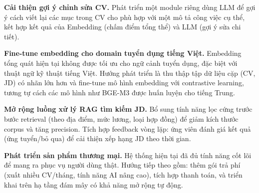 \documentclass[../DoAn.tex]{subfiles}
\begin{document}
\textbf{Cải thiện gợi ý chỉnh sửa CV.} Phát triển một module riêng dùng LLM để gợi ý cách viết lại các mục trong CV cho phù hợp với một mô tả công việc cụ thể, kết hợp kết quả của Embedding (chấm điểm tổng thể) và LLM (gợi ý sửa chi tiết).

\textbf{Fine-tune embedding cho domain tuyển dụng tiếng Việt.} Embedding tổng quát hiện tại không được tối ưu cho ngữ cảnh tuyển dụng, đặc biệt với thuật ngữ kỹ thuật tiếng Việt. Hướng phát triển là thu thập tập dữ liệu cặp (CV, JD) có nhãn lớn hơn và fine-tune mô hình embedding với contrastive learning, tương tự cách các mô hình như BGE-M3 được huấn luyện cho tiếng Trung.

\textbf{Mở rộng luồng xử lý RAG tìm kiếm JD.} Bổ sung tính năng lọc cứng trước bước retrieval (theo địa điểm, mức lương, loại hợp đồng) để giảm kích thước corpus và tăng precision. Tích hợp feedback vòng lặp: ứng viên đánh giá kết quả (ứng tuyển/bỏ qua) để cải thiện xếp hạng JD theo thời gian.

\textbf{Phát triển sản phẩm thương mại.} Hệ thống hiện tại đã đủ tính năng cốt lõi để mang ra phục vụ người dùng thật. Hướng tiếp theo gồm: thêm gói trả phí (xuất nhiều CV/tháng, tính năng AI nâng cao), tích hợp thanh toán, và triển khai trên hạ tầng đám mây có khả năng mở rộng tự động.
\end{document}

